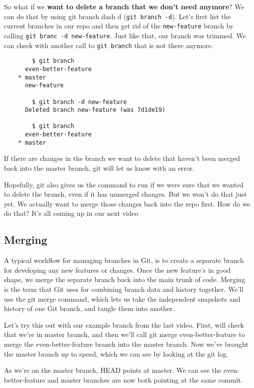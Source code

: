 	So what if we \textbf{want to delete a branch that we don't need anymore}? We can do that by using git branch dash d (\texttt{git branch -d}).
	Let's first list the current branches in our repo and then get rid of the \verb|new-feature| branch by calling \verb|git branc -d new-feature|. Just like that, our branch was trimmed. We can check with another call to \texttt{git branch} that is not there anymore.
	
	\begin{verbatim}
		$ git branch
	  even-better-feature
	* master
	  new-feature
	  
	  	$ git branch -d new-feature
	  Deleted branch new-feature (was 7d1de19)
	  	
	  	$ git branch
      even-better-feature
  	* master
	\end{verbatim}
	
	If there are changes in the branch we want to delete that haven't been merged back into the master branch, git will let us know with an error.
	
	Hopefully, git also gives us the command to run if we were sure that we wanted to delete the branch, even if it has unmerged changes. But we won't do that just yet. We actually want to merge those changes back into the repo first. How do we do that? It's all coming up in our next video
	
	\subsection{Merging}
	
	
	A typical workflow for managing branches in Git, is to create a separate branch for developing any new features or changes. Once the new feature's in good shape, we merge the separate branch back into the main trunk of code. Merging is the term that Git uses for combining branch data and history together. We'll use the git merge command, which lets us take the independent snapshots and history of one Git branch, and tangle them into another.
	
	Let's try this out with our example branch from the last video. First, will check that we're in master branch, and then we'll call git merge even-better-feature to merge the even-better-feature branch into the master branch. Now we've brought the master branch up to speed, which we can see by looking at the git log.
	
	As we're on the master branch, HEAD points at master. We can see the even-better-feature and master branches are now both pointing at the same commit.
	
